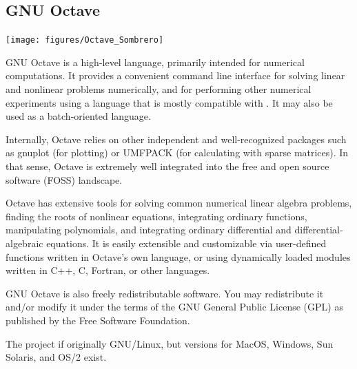 \subsection{GNU Octave}

\begin{floatingfigure}[r]{5cm}
\centering
\texttt{[image: figures/Octave\_Sombrero]}
\end{floatingfigure}

GNU Octave is a high-level language, primarily intended for numerical
computations. It provides a convenient command line interface for solving
linear and nonlinear problems numerically, and for performing other numerical
experiments using a language that is mostly compatible with \matlab{}. It may
also be used as a batch-oriented language.

Internally, Octave relies on other independent and well-recognized packages
such as gnuplot (for plotting) or UMFPACK (for calculating with sparse
matrices). In that sense, Octave is extremely well integrated into the free
and open source software (FOSS) landscape.

Octave has extensive tools for solving common numerical linear algebra
problems, finding the roots of nonlinear equations, integrating ordinary
functions, manipulating polynomials, and integrating ordinary differential and
differential-algebraic equations. It is easily extensible and customizable via
user-defined functions written in Octave's own language, or using dynamically
loaded modules written in C++, C, Fortran, or other languages.

GNU Octave is also freely redistributable software. You may redistribute it
and/or modify it under the terms of the GNU General Public License (GPL) as
published by the Free Software Foundation.

The project if originally GNU/Linux, but versions for MacOS, Windows, Sun
Solaris, and OS/2 exist.
